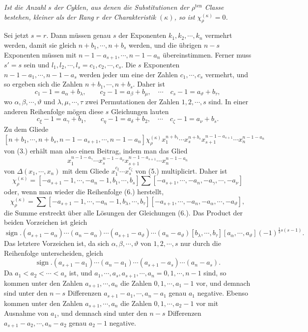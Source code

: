 \documentclass[11pt]{article}
\newcommand{\ten}{\mathrm{ten}}
\newcommand{\sign}{\operatorname{sign}}
\begin{document}
\emph{Ist die Anzahl $s$ der Cyklen, aus denen die Substitutionen der $\rho^{\ten}$ Classe bestehen, kleiner als der Rang $r$ der Charakteristik $(\kappa)$, so ist $\chi_\rho^{(\kappa)}=0$.}

Sei jetzt $s=r$. Dann müssen genau $s$ der Exponenten $k_1,k_2,
\cdots,k_n$ vermehrt werden, damit sie gleich $n+b_1,
\cdots,n+b_s$ werden, und die übrigen $n-s$ Exponenten müssen mit $n-1-a_{s+1},
\cdots,n-1-a_n$ übereinstimmen. Ferner muss $s'=s$ sein und $l_1,l_2,
\cdots,l_s=c_1,c_2,
\cdots,c_s$. Die $s$ Exponenten $n-1-a_1,
\cdots,n-1-a_s$ werden jeder um eine der Zahlen $c_1,
\cdots,c_s$ vermehrt, und so ergeben sich die Zahlen $n+b_1,
\cdots,n+b_s$. Daher ist
\begin{equation}\tag{6.}
 c_1-1=a_\alpha+b_\lambda,
\qquad c_2-1=a_\beta+b_\mu,
\quad\cdots\quad c_s-1=a_\vartheta+b_\tau,
\end{equation}
wo $\alpha,
\beta,
\cdots,
\vartheta$ und $\lambda,
\mu,
\cdots,
\tau$ zwei Permutationen der Zahlen $1,2,
\cdots,s$ sind. In einer anderen Reihenfolge mögen diese $s$ Gleichungen lauten
\[
 c_\xi-1=a_\gamma+b_1,
\qquad c_\eta-1=a_\delta+b_2,
\quad\cdots\quad c_\zeta-1=a_\nu+b_s.
\]
Zu dem Gliede
\[
 [n+b_1,
\cdots,n+b_s,n-1-a_{s+1},
\cdots,n-1-a_n]\chi_\rho^{(\kappa)}x_1^{n+b_1}\cdots x_s^{n+b_s}x_{s+1}^{n-1-a_{s+1}}\cdots x_n^{n-1-a_n}
\]
von (3.) erhält man also einen Beitrag, indem man das Glied
\[
 x_1^{n-1-a_\gamma}\cdots x_s^{n-1-a_\nu}x_{s+1}^{n-1-a_{s+1}}\cdots x_n^{n-1-a_n}
\]
von $\Delta(x_1,
\cdots,x_n)$ mit dem Gliede $x_1^{c_\xi}\cdots x_s^{c_\zeta}$ von (5.) multiplicirt. Daher ist
\[
 \chi_\rho^{(\kappa)}=[-a_{s+1}-1,
\cdots,-a_n-1,b_1,
\cdots,b_s]
 \sum[-a_{s+1},
\cdots,-a_n,-a_\gamma,
\cdots,-a_\nu]
\]
oder, wenn man wieder die Reihenfolge (6.) herstellt,
\[
 \chi_\rho^{(\kappa)}=\sum[-a_{s+1}-1,
\cdots,-a_n-1,b_\lambda,
\cdots,b_\tau][-a_{s+1},
\cdots,-a_n,-a_\alpha,
\cdots,-a_\vartheta],
\]
die Summe erstreckt über alle Lösungen der Gleichungen (6.). Das Product der beiden Vorzeichen ist gleich
\[
 \sign.(a_{s+1}-a_\alpha)\cdots(a_n-a_\alpha)\cdots(a_{s+1}-a_\vartheta)\cdots(a_n-a_\vartheta)
 [b_\lambda,
\cdots,b_\tau][a_\alpha,
\cdots,a_\vartheta](-1)^{\frac12s(s-1)}.
\]
Das letztere Vorzeichen ist, da sich $\alpha,
\beta,
\cdots,
\vartheta$ von $1,2,
\cdots,s$ nur durch die Reihenfolge unterscheiden, gleich
\[
 \sign.(a_{s+1}-a_1)
\cdots(a_n-a_1)
\cdots(a_{s+1}-a_s)
\cdots(a_n-a_s).
\]
Da $a_1<a_2<\cdots<a_s$ ist, und $a_1,
\cdots,a_s,a_{s+1},
\cdots,a_n=0,1,
\cdots,n-1$ sind, so kommen unter den Zahlen $a_{s+1},
\cdots,a_n$ die Zahlen $0,1,
\cdots,a_1-1$ vor, und demnach sind unter den $n-s$ Differenzen $a_{s+1}-a_1,
\cdots,a_n-a_1$ genau $a_1$ negative. Ebenso kommen unter den Zahlen $a_{s+1},
\cdots,a_n$ die Zahlen $0,1,
\cdots,a_2-1$ vor mit Ausnahme von $a_1$, und demnach sind unter den $n-s$ Differenzen $a_{s+1}-a_2,
\cdots,a_n-a_2$ genau $a_2-1$ negative.
\end{document}
